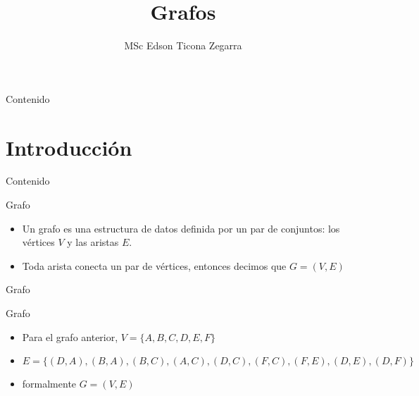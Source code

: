 \documentclass[]{beamer}
\title{Grafos}
\author{MSc Edson Ticona Zegarra}
\institute{Campamento de Programaci\'on}
\date{}
\begin{document}
\maketitle

\begin{frame}{Contenido}
\tableofcontents
\end{frame}

\section{Introducci\'on}
\begin{frame}{Contenido}
\tableofcontents[currentsection]
\end{frame}

\begin{frame}{Grafo}
  \begin{itemize}
    \item Un grafo es una estructura de datos definida por un par de conjuntos: los v\'ertices $V$ y las aristas $E$.
      \pause
    \item Toda arista conecta un par de v\'ertices, entonces decimos que $G = (V,E)$
  \end{itemize}
\end{frame}

\begin{frame}{Grafo}
  \centering
\end{frame}

\begin{frame}{Grafo}
  \begin{itemize}
    \item Para el grafo anterior, $V = \{A, B, C, D, E, F\}$
      \pause
    \item $E= \{ (D, A), (B, A), (B, C), (A, C), (D, C), (F, C), (F, E), (D, E), (D, F) \} $
      \pause
    \item formalmente $G=(V,E)$
  \end{itemize}
\end{frame}
\end{document}
